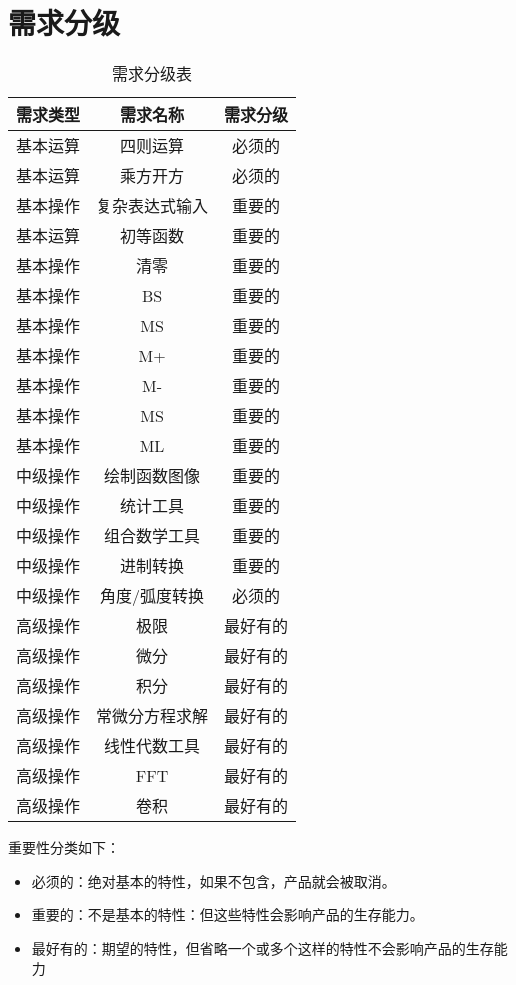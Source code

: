 \chapter{需求分级}
\begin{table}[htbp]
\centering
\caption{需求分级表} \label{tab:classification}
\begin{tabular}{|c|c|c|}
    \hline
    需求类型 & 需求名称 & 需求分级 \\
    \hline
    基本运算 & 四则运算 & 必须的 \\
    \hline
    基本运算 & 乘方开方 & 必须的 \\
    \hline
    基本操作 & 复杂表达式输入 & 重要的 \\
    \hline
    基本运算 & 初等函数 & 重要的 \\
    \hline
    基本操作 & 清零 & 重要的 \\
    \hline
    基本操作 & BS & 重要的 \\
    \hline
    基本操作 & MS & 重要的 \\
    \hline
    基本操作 & M+ & 重要的 \\
    \hline
    基本操作 & M- & 重要的 \\
    \hline
    基本操作 & MS & 重要的 \\
    \hline
    基本操作 & ML & 重要的 \\
    \hline
    中级操作 & 绘制函数图像 & 重要的 \\
    \hline
    中级操作 & 统计工具 & 重要的 \\
    \hline
    中级操作 & 组合数学工具 & 重要的 \\
    \hline
    中级操作 & 进制转换 & 重要的 \\
    \hline
    中级操作 & 角度/弧度转换 & 必须的 \\
    \hline
    高级操作 & 极限 & 最好有的 \\
    \hline
    高级操作 & 微分 & 最好有的 \\
    \hline
    高级操作 & 积分 & 最好有的 \\
    \hline
    高级操作 & 常微分方程求解 & 最好有的 \\
    \hline
    高级操作 & 线性代数工具 & 最好有的 \\
    \hline
    高级操作 & FFT & 最好有的 \\
    \hline
    高级操作 & 卷积 & 最好有的 \\
    \hline
\end{tabular}
\end{table}

重要性分类如下：
\begin{itemize}
\item 必须的：绝对基本的特性，如果不包含，产品就会被取消。
\item 重要的：不是基本的特性：但这些特性会影响产品的生存能力。
\item 最好有的：期望的特性，但省略一个或多个这样的特性不会影响产品的生存能力
\end{itemize}
